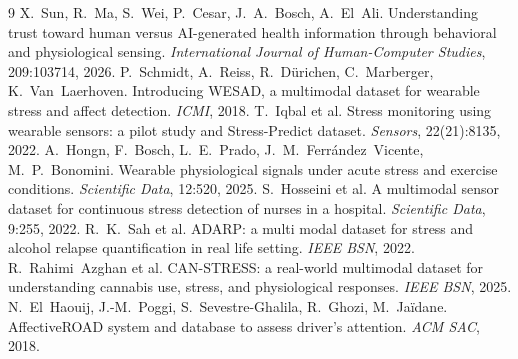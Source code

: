 \documentclass{article}
\begin{document}
{\footnotesize
\begin{thebibliography}{9}
\setlength{\itemsep}{0pt}
 X.~Sun, R.~Ma, S.~Wei, P.~Cesar, J.~A.~Bosch, A.~El~Ali. Understanding trust toward human versus AI-generated health information through behavioral and physiological sensing. \emph{International Journal of Human-Computer Studies}, 209:103714, 2026.
 P.~Schmidt, A.~Reiss, R.~D\"urichen, C.~Marberger, K.~Van~Laerhoven. Introducing WESAD, a multimodal dataset for wearable stress and affect detection. \emph{ICMI}, 2018.
 T.~Iqbal et al. Stress monitoring using wearable sensors: a pilot study and Stress-Predict dataset. \emph{Sensors}, 22(21):8135, 2022.
 A.~Hongn, F.~Bosch, L.~E.~Prado, J.~M.~Ferr\'andez~Vicente, M.~P.~Bonomini. Wearable physiological signals under acute stress and exercise conditions. \emph{Scientific Data}, 12:520, 2025.
 S.~Hosseini et al. A multimodal sensor dataset for continuous stress detection of nurses in a hospital. \emph{Scientific Data}, 9:255, 2022.
 R.~K.~Sah et al. ADARP: a multi modal dataset for stress and alcohol relapse quantification in real life setting. \emph{IEEE BSN}, 2022.
 R.~Rahimi~Azghan et al. CAN-STRESS: a real-world multimodal dataset for understanding cannabis use, stress, and physiological responses. \emph{IEEE BSN}, 2025.
 N.~El~Haouij, J.-M.~Poggi, S.~Sevestre-Ghalila, R.~Ghozi, M.~Ja\"idane. AffectiveROAD system and database to assess driver's attention. \emph{ACM SAC}, 2018.
\end{thebibliography}
}
\end{document}
